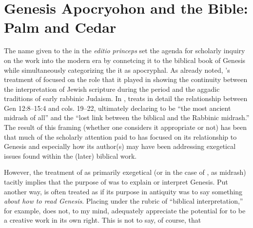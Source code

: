 \section{Genesis Apocryohon and the Bible: Palm and Cedar}





The name given to the \ga in the \emph{editio princeps} set the agenda for scholarly inquiry on the work into the modern era by connetcing it to the biblical book of Genesis while simultaneously categorizing the it as apocryphal. As already noted, \vermes's treatment of \ga focused on the role that it played in showing the continuity between the interpretation of Jewish scripture during the \secondtemple period and the aggadic traditions of early rabbinic Judaism. In \cite*{vermes1961}, \vermes treats in detail the relationship between Gen 12:8--15:4 and \ga cols. 19--22, ultimately declaring \ga to be ``the most ancient midrash of all'' and the ``lost link between the biblical and the Rabbinic midrash.''\autocite[124]{vermes1961} The result of this framing (whether one considers it appropriate or not) has been that much of the scholarly attention paid to \ga has focused on its relationship to Genesis and especially how its author(s) may have been addressing exegetical issues found within the (later) biblical work. 

However, the treatment of \ga as primarily exegetical (or in the case of \vermes, as midrash) tacitly implies that the purpose of \ga was to explain or interpret Genesis. Put another way, \ga is often treated as if its purpose in antiquity was to say something \emph{about how to read Genesis}. Placing \ga under the rubric of ``biblical interpretation,'' for example, does not, to my mind, adequately appreciate the potential for \ga to be a creative work in its own right. This is not to say, of course, that 